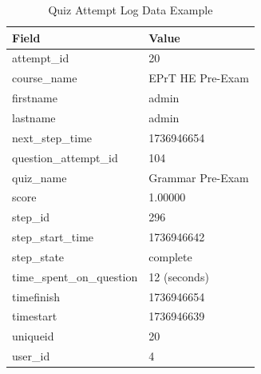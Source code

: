 \begin{table}[htbp]
\centering
\caption{Quiz Attempt Log Data Example}
\label{tab:quiz_attempt_log}
\begin{tabular}{|l|l|}
\hline
\textbf{Field} & \textbf{Value} \\ \hline
attempt\_id & 20 \\ \hline
course\_name & EPrT HE Pre-Exam \\ \hline
firstname & admin \\ \hline
lastname & admin \\ \hline
next\_step\_time & 1736946654 \\ \hline
question\_attempt\_id & 104 \\ \hline
quiz\_name & Grammar Pre-Exam \\ \hline
score & 1.00000 \\ \hline
step\_id & 296 \\ \hline
step\_start\_time & 1736946642 \\ \hline
step\_state & complete \\ \hline
time\_spent\_on\_question & 12 (seconds) \\ \hline
timefinish & 1736946654 \\ \hline
timestart & 1736946639 \\ \hline
uniqueid & 20 \\ \hline
user\_id & 4 \\ \hline
\end{tabular}
\end{table}

